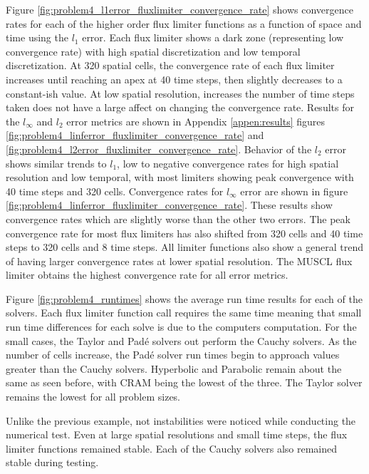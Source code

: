 Figure \ref{fig:problem4_l1error_fluxlimiter_convergence_rate} shows convergence rates for each of the higher order flux limiter functions as a function of space and time using the $l_{1}$ error. Each flux limiter shows a dark zone (representing low convergence rate) with high spatial discretization and low temporal discretization. At 320 spatial cells, the convergence rate of each flux limiter increases until reaching an apex at 40 time steps, then slightly decreases to a constant-ish value. At low spatial resolution, increases the number of time steps taken does not have a large affect on changing the convergence rate. Results for the $l_{\infty}$ and $l_{2}$ error metrics are shown in Appendix \ref{appen:results} figures \ref{fig:problem4_linferror_fluxlimiter_convergence_rate} and \ref{fig:problem4_l2error_fluxlimiter_convergence_rate}. Behavior of the $l_{2}$ error shows similar trends to $l_{1}$, low to negative convergence rates for high spatial resolution and low temporal, with most limiters showing peak convergence with 40 time steps and 320 cells. Convergence rates for $l_{\infty}$ error are shown in figure \ref{fig:problem4_linferror_fluxlimiter_convergence_rate}. These results show convergence rates which are slightly worse than the other two errors. The peak convergence rate for most flux limiters has also shifted from 320 cells and 40 time steps to 320 cells and 8 time steps. All limiter functions also show a general trend of having larger convergence rates at lower spatial resolution. The MUSCL flux limiter obtains the highest convergence rate for all error metrics. 

Figure \ref{fig:problem4_runtimes} shows the average run time results for each of the solvers. Each flux limiter function call requires the same time meaning that small run time differences for each solve is due to the computers computation. For the small cases, the Taylor and Pad\'e solvers out perform the Cauchy solvers. As the number of cells increase, the Pad\'e solver run times begin to approach values greater than the Cauchy solvers. Hyperbolic and Parabolic remain about the same as seen before, with CRAM being the lowest of the three. The Taylor solver remains the lowest for all problem sizes. 

Unlike the previous example, not instabilities were noticed while conducting the numerical test. Even at large spatial resolutions and small time steps, the flux limiter functions remained stable. Each of the Cauchy solvers also remained stable during testing. 

